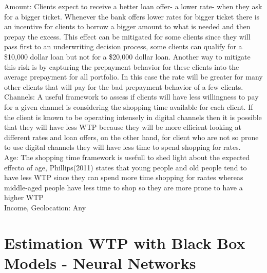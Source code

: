 Amount: Clients expect to receive a better loan offer- a lower rate- when they ask for a bigger ticket. Whenever the bank offers lower rates for bigger ticket there is an incentive for clients to borrow a bigger amount to what is needed and then prepay the excess. This effect can be mitigated for some clients since they will pass first to an underwriting decision process, some clients can qualify for a \$10,000 dollar loan but not for a \$20,000 dollar loan. Another way to mitigate this risk is by capturing the prepayment behavior for these clients into the average prepayment for all portfolio. In this case the rate will be greater for many other clients that will pay for the bad prepayment behavior of a few clients. \\

Channels: A useful framework to assess if clients will have less willingness to pay for a given channel is considering the shopping time available for each client. If the client is known to be operating intensely in digital channels then it is possible that they will have less WTP because they will be more efficient looking at different rates and loan offers, on the other hand, for client who are not so prone to use digital channels they will have less time to spend shopping for rates. \\

Age: The shopping time framework is usefull to shed light about the expected effecto of age, Phillips(2011) \cite{phillips-2021} states that young people and old people tend to have less WTP since they can spend more time shopping for raates whereas middle-aged people have less time to shop so they are more prone to have a higher WTP\\

Income, Geolocation: Any 


\section{Estimation WTP with Black Box Models - Neural Networks}
